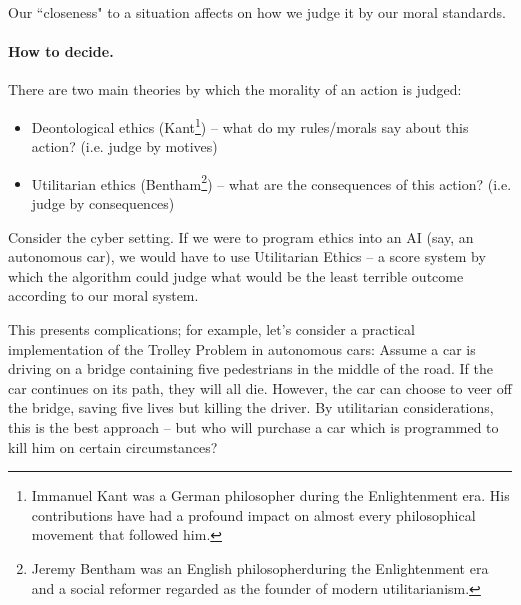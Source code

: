 Our ``closeness" to a situation affects on how we judge it by our moral standards.

\paragraph{How to decide.} There are two main theories by which the morality of
an action is judged:
\begin{itemize}
    \item Deontological ethics (Kant\footnote{Immanuel Kant was a German philosopher during the
    Enlightenment era. His contributions have had a profound impact on almost every philosophical movement that followed him.})
    -- what do my rules/morals say about this
    action? (i.e. judge by motives)
    \item Utilitarian ethics (Bentham\footnote{Jeremy Bentham was an English philosopherduring the
    Enlightenment era and a social reformer regarded as the founder of modern utilitarianism.}) -- what are the consequences of this
    action? (i.e. judge by consequences)
\end{itemize}

Consider the cyber setting. If we were to program ethics into an AI (say, an
autonomous car), we would have to use Utilitarian Ethics -- a score system by
which the algorithm could judge what would be the least terrible outcome
according to our moral system.

This presents complications; for example, let's consider a practical
implementation of the Trolley Problem in autonomous cars: Assume a car is
driving on a bridge containing five pedestrians in the middle of the road. If
the car continues on its path, they will all die. However, the car can choose to
veer off the bridge, saving five lives but killing the driver. By utilitarian
considerations, this is the best approach – but who will purchase a car which is
programmed to kill him on certain circumstances?

